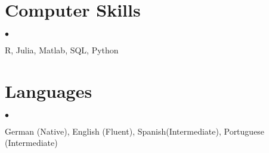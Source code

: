 \documentclass[margin,line]{res}
\newenvironment{list2}{
  \begin{list}{$\bullet$}{%
      \setlength{\itemsep}{0in}
      \setlength{\parsep}{0in} \setlength{\parskip}{0in}
      \setlength{\topsep}{0in} \setlength{\partopsep}{0in} 
      \setlength{\leftmargin}{0.2in}}}{\end{list}}
\begin{document}
\begin{resume}
\section{\sc Computer Skills} 
\begin{list2}
\item R, Julia, Matlab, SQL, Python
\end{list2}

\section{\sc Languages} 
\begin{list2}
\item German (Native), English (Fluent), Spanish(Intermediate), Portuguese (Intermediate)
\end{list2}

\end{resume}
\end{document}
